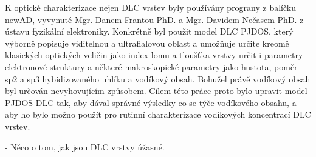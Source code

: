 K optické charakterizace nejen DLC vrstev byly používány prograny z balíčku newAD, vyvynuté Mgr. Danem Frantou PhD. a Mgr. Davidem Nečasem PhD. z ústavu fyzikální elektroniky. Konkrétně byl použit model DLC PJDOS, který výborně popisuje viditelnou a ultrafialovou oblast a umožňuje určite kreomě klasických optických veličin jako index lomu a tloušťka vrstvy určit i parametry elektronové struktury a některé makroskopické parametry jako hustota, poměr sp2 a sp3 hybidizovaného uhlíku a vodíkový obsah. Bohužel právě vodíkový obsah byl určován nevyhovujícím způsobem. Cílem této práce proto bylo upravit model PJDOS DLC tak, aby dával správné výsledky co se týče vodíkového obsahu, a aby ho bylo možno použít pro rutinní charakterizace vodíkových koncentrací DLC vrstev.   
 

- Něco o tom, jak jsou DLC vrstvy úžasné.

\cleardoublepage

